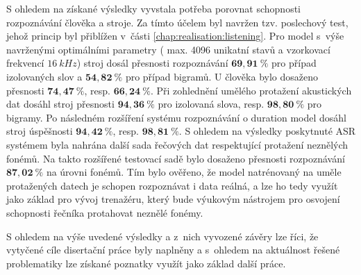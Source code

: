 S ohledem na získané výsledky vyvstala potřeba porovnat schopnosti rozpoznávání člověka a stroje. Za tímto účelem byl navržen tzv. poslechový test, jehož princip byl přiblížen v~části \ref{chap:realisation:listening}. Pro model s~výše navrženými optimálními parametry ( max. 4096 unikatní stavů a vzorkovací frekvencí $16\ kHz$) stroj dosál přesnosti rozpoznávání  $\boldsymbol{69,91~\%}$ pro případ izolovaných slov a $\boldsymbol{54,82~\%}$ pro případ bigramů. U člověka bylo dosaženo přesnosti $\boldsymbol{74,47~\%}$, resp. $\boldsymbol{66,24~\%}$. Při zohlednění umělého protažení akustických dat dosáhl stroj přesnosti $\boldsymbol{94,36~\%}$ pro izolovaná slova, resp. $\boldsymbol{98,80~\%}$ pro bigramy. Po následném rozšíření systému rozpoznávání o duration model dosáhl stroj úspěšnosti $\boldsymbol{94,42~\%}$, resp. $\boldsymbol{98,81~\%}$. S ohledem na výsledky poskytnuté ASR systémem byla nahrána další sada řečových dat respektující protažení neznělých fonémů. Na takto rozšířené testovací sadě bylo dosaženo přesnosti rozpoznávání $\boldsymbol{87,02~\%}$ na úrovni fonémů. Tím bylo ověřeno, že model natrénovaný na uměle protažených datech je schopen rozpoznávat i data reálná, a lze ho tedy využít jako základ pro vývoj trenažéru, který bude výukovým nástrojem pro osvojení schopnosti řečníka protahovat neznělé fonémy.

S ohledem na výše uvedené výsledky a z~nich vyvozené závěry lze říci, že vytyčené cíle disertační práce byly naplněny a s~ohledem na aktuálnost řešené problematiky lze získané poznatky využít jako základ další práce.

\ifdefined\CELE
\else

\fi
